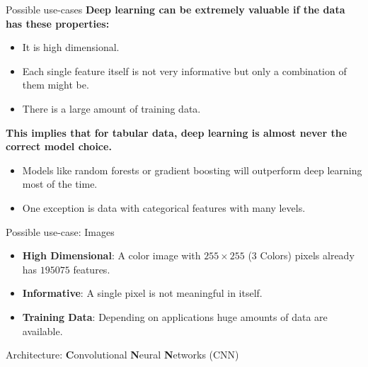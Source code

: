 \begin{frame} {Possible use-cases}
\textbf{Deep learning can be extremely valuable if the data has these properties:}
\vspace{.2cm}
\begin{itemize}
\item It is high dimensional.
\item Each single feature itself is not very informative but only a combination of them might be.
\item There is a large amount of training data.
\end{itemize}
\vspace{.7cm}
\textbf{This implies that for tabular data, deep learning is almost never the correct model choice.}
\vspace{.2cm}
\begin{itemize}
\item Models like random forests or gradient boosting will outperform deep learning most of the time.
\item One exception is data with categorical features with many levels.
\end{itemize}

\end{frame}

\begin{frame} {Possible use-case: Images}
\begin{itemize}
\item \textbf{High Dimensional}: A color image with $255 \times 255$ (3 Colors) pixels already has $195075$ features.
\vspace{.1cm}
\item \textbf{Informative}: A single pixel is not meaningful in itself.
\vspace{.1cm}
\item \textbf{Training Data}: Depending on applications huge amounts of data are available.
\end{itemize}
\vspace{.3cm}
Architecture: \textbf{C}onvolutional \textbf{N}eural \textbf{N}etworks (CNN)
\begin{figure}
\centering
{}
\end{figure}
\end{frame}

